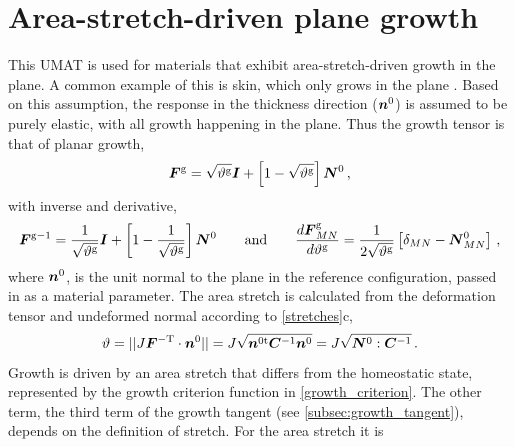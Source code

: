 \documentclass[10pt,letterpaper,oneside]{report}
\newcommand{\ten}[1]{\mbox{\boldmath $#1$}{}}
\newcommand{\scas}[1]{\mbox{{\scriptsize{${\rm{#1}}$}}}{}}
\begin{document}
\section{Area-stretch-driven plane growth}

This UMAT is used for materials that exhibit area-stretch-driven growth in the plane.  A common example of this is skin, which only grows in the plane \autocite{BuganzaTepole2011, Zollner2013}.  Based on this assumption, the response in the thickness direction ($\ten{n}^0$) is assumed to be purely elastic, with all growth happening in the plane.  Thus the growth tensor is that of planar growth,
\begin{equation}
\ten{F}^{\scas{g}} = \sqrt{\vartheta^{\scas{g}}} \ten{I} + \left[1-\sqrt{\vartheta^{\scas{g}}} \right] \ten{N}^0 \, , 
\label{Fg_planar}
\end{equation}
with inverse and derivative,
\begin{equation}
\ten{F}^{\scas{g}-1} = \frac{1}{\sqrt{\vartheta^{\scas{g}}}} \ten{I} + \left[1-\frac{1}{\sqrt{\vartheta^{\scas{g}}}} \right] \ten{N}^0 
\qquad \text{and} \qquad
\frac{d \ten{F}^{\scas{g}}_{MN} }{d \vartheta^{\scas{g}}} = \frac{1}{2\sqrt{\vartheta^{\scas{g}}}} \left[ \delta_{MN} - \ten{N}^0_{MN} \right] \, ,
\label{Fg_planar2}
\end{equation}
where $\ten{n}^0$, is the unit normal to the plane in the reference configuration, passed in as a material parameter.
The area stretch is calculated from the deformation tensor and undeformed normal according to \autoref{stretches}c,
\begin{equation*}
\vartheta = \vert\vert J \ten{F}^{-\scas{T}} \cdot \ten{n}^0 \vert\vert = J \sqrt{\ten{n}^{0 \scas{t}} \ten{C}^{-1} \ten{n}^0} = J \sqrt{\ten{N}^0 :  \ten{C}^{-1} } \, . 
\end{equation*}
Growth is driven by an area stretch that differs from the homeostatic state, represented by the growth criterion function in \autoref{growth_criterion}.
The other term, the third term of the growth tangent (see \autoref{subsec:growth_tangent}), depends on the definition of stretch.  For the area stretch it is
\end{document}
